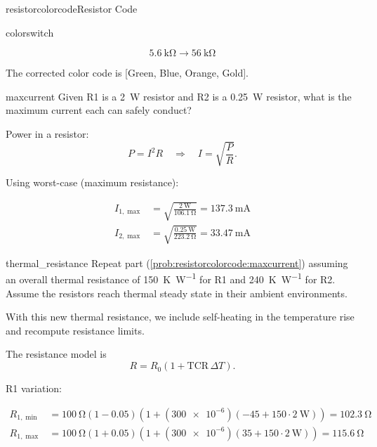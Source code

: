 \begin{mainquestion}{resistorcolorcode}{Resistor Code}
\begin{partquestion}{colorswitch}
\begin{answer}
\[
\qty{5.6}{\kilo\ohm} \rightarrow \qty{56}{\kilo\ohm}
\]

The corrected color code is [Green, Blue, Orange, Gold].
\end{answer}
\end{partquestion}

\begin{partquestion}{maxcurrent}
{Given R1 is a \qty{2}{\watt} resistor and R2 is a \qty{0.25}{\watt} resistor, what is the maximum current each can safely conduct?}

\begin{answer}

Power in a resistor:
\[
P = I^2R
\quad\Rightarrow\quad
I = \sqrt{\frac{P}{R}}.
\]

Using worst-case (maximum resistance):

\begin{align*}
I_{1,\max} &= \sqrt{\frac{\qty{2}{\watt}}{\qty{106.1}{\ohm}}}
= \qty{137.3}{\milli\ampere} \\
I_{2,\max} &= \sqrt{\frac{\qty{0.25}{\watt}}{\qty{223.2}{\ohm}}}
= \qty{33.47}{\milli\ampere}
\end{align*}

\end{answer}
\end{partquestion}

\begin{partquestion}{thermal_resistance}
{Repeat part (\cref{prob:resistorcolorcode:maxcurrent}) assuming an overall thermal resistance of \qty{150}{\kelvin\per\watt} for R1 and \qty{240}{\kelvin\per\watt} for R2. Assume the resistors reach thermal steady state in their ambient environments.}

\begin{answer}

With this new thermal resistance, we include self-heating in the temperature rise and recompute resistance limits.

The resistance model is
\[
R = R_0\left(1 + \mathrm{TCR}\,\Delta T\right).
\]

R1 variation:

\begin{align*}
R_{1,\min} &=
\qty{100}{\ohm}\left(1-\num{0.05}\right)
\left(1+(\num{300e-6})\left(-45 + 150\cdot \qty{2}{\watt}\right)\right)
= \qty{102.3}{\ohm} \\
R_{1,\max} &=
\qty{100}{\ohm}\left(1+\num{0.05}\right)
\left(1+(\num{300e-6})\left(35 + 150\cdot \qty{2}{\watt}\right)\right)
= \qty{115.6}{\ohm}
\end{align*}


\end{answer}
\end{partquestion}
\end{mainquestion}
